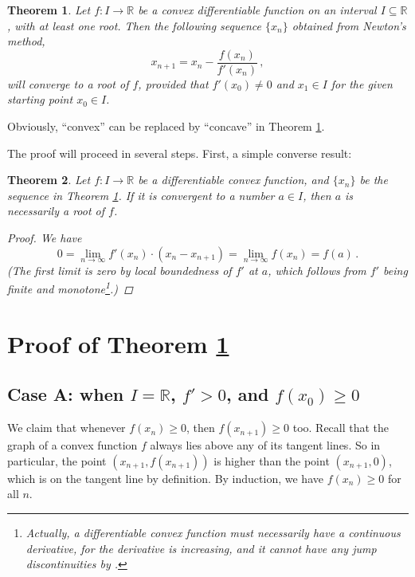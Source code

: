 \documentclass[12pt]{article}
\newcommand{\real}{\mathbb{R}}
\newtheorem{thm}{Theorem}
\begin{document}

\begin{thm}
\label{thm:main}
Let $f\colon I \to \real$ be a convex differentiable function
on an interval $I \subseteq \real$, with at least one root.
Then the following sequence $\{ x_n \}$
obtained from Newton's method,
\[
x_{n+1} = x_n - \frac{f(x_n)}{f'(x_n)}\,,
\]
will converge to a root of $f$, provided that
$f'(x_0) \neq 0$ and $x_1 \in I$ for the given starting point $x_0 \in I$.
\end{thm}

Obviously, ``convex'' can be replaced by ``concave'' in Theorem \ref{thm:main}.

The proof will proceed in several steps.  First, a simple converse result:

\begin{thm}
\label{thm:converse}
Let $f\colon I \to \real$ be a differentiable convex function,
and $\{x_n\}$ be the sequence in Theorem \ref{thm:main}.
If it is convergent to a number $a \in I$,
then $a$ is necessarily a root of $f$.

\begin{proof}
We have
\[
0 = \lim_{n \to \infty} f'(x_n) \cdot (x_n - x_{n+1}) = 
\lim_{n \to \infty} f(x_n) = f(a)\,.
\]
(The first limit is zero by local boundedness of $f'$ at $a$,
which follows from $f'$ being finite and monotone\footnote{
Actually, a differentiable convex function must necessarily have a continuous derivative,
for the derivative is increasing, and it cannot have any jump discontinuities by 
.}.)
\end{proof}
\end{thm}

\section*{Proof of Theorem \ref{thm:main}}

\subsection*{Case A: when $I = \real$, $f' > 0$, and $f(x_0) \geq 0$}
We claim that whenever $f(x_n) \geq 0$, then $f(x_{n+1}) \geq 0$ too.
Recall that the graph of a convex function $f$ always lies 
above any of its tangent lines.
So in particular, the point $(x_{n+1}, f(x_{n+1}))$ is higher than the point
$(x_{n+1}, 0)$, which is on the tangent line by definition.
By induction, we have $f(x_n) \geq 0$ for all $n$.
\end{document}
